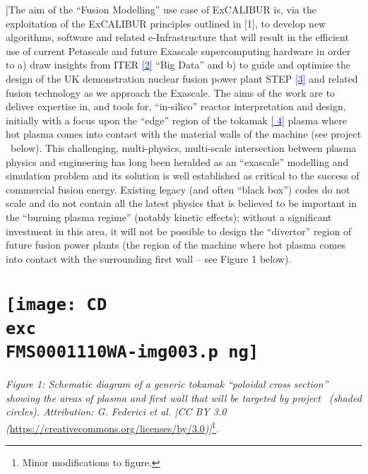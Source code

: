 \documentclass[a4paper]{article}
\newcommand\textstyleInternetlink[1]{\textcolor{blue}{#1}}
\begin{document}
]{\textmd{{The aim of the ``Fusion
Modelling'' use case of ExCALIBUR is, via the exploitation of the ExCALIBUR 
principles outlined in [1], to develop new
algorithms, software and related e-Infrastructure that will result in the 
efficient use of current Petascale and future
Exascale supercomputing hardware in order to a) draw insights from ITER
}}\href{https://www.iter.org/}{\textstyleInternetlink{\textmd{{[2]}}}}\textmd{{ 
``Big
Data'' and b) to guide and optimise the design of the UK demonstration nuclear 
fusion power plant STEP
}}\href{https://www.gov.uk/government/news/uk-to-take-a-big-step-to-fusion-elect
ricity}{\textstyleInternetlink{\textmd{{[3]}}}}\textmd{{
and related fusion technology as we approach the Exascale. The aims of the work 
are to deliver expertise in, and tools
for, ``in-silico'' reactor interpretation and design, initially with a focus 
upon the ``edge'' region of the tokamak
}}\href{https://en.wikipedia.org/wiki/Tokamak}{\textstyleInternetlink{\textmd{{[
4]}}}}\textmd{{
plasma where hot plasma comes into contact with the material walls of the 
machine (see project \nep \  below). This
challenging, multi-physics, multi-scale intersection between plasma physics and 
engineering has long been heralded as
an ``exascale'' modelling and simulation problem and its solution is well 
established as critical to the success of
commercial fusion energy. Existing legacy (and often ``black box'') codes do 
not scale and do not contain all the
latest physics that is believed to be important in the ``burning plasma 
regime'' (notably kinetic effects); without a
significant investment in this area, it will not be possible to design the 
``divertor'' region of future fusion power
plants (the region of the machine where hot plasma comes into contact with the 
surrounding first wall -- see Figure 1
below). }}}

\bigskip

\section[]{ 
\texttt{[image: CD\\exc \\ FMS0001110WA-img003.p
ng]} }
{
\textit{{Figure 1: Schematic diagram of a generic tokamak ``poloidal cross 
section'' showing the areas
of plasma and first wall that will be targeted by project \nep \  (shaded 
circles). Attribution: G. Federici et al. [CC
BY 3.0 
(}}\url{https://creativecommons.org/licenses/by/3.0}\textit{{)]}}\footnote{
\foreignlanguage{english}{Minor modifications to figure.}}\textit{{.}}}
\end{document}
